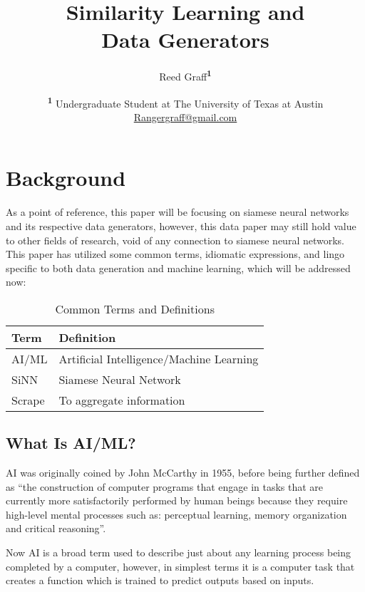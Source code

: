 \documentclass[
	letterpaper, %
	10pt, %
	unnumberedsections, %
	twoside, %
]{LTJournalArticle}
\title{Similarity Learning and\\ Data Generators} %
\author{%
	Reed Graff\textsuperscript{\textbf{1}}
}
\date{\footnotesize\textsuperscript{\textbf{1}} Undergraduate Student at The University of Texas at Austin \\ \href{mailto:Rangergraff@gmail.com}{Rangergraff@gmail.com}}
\begin{document}
\maketitle %


\section{Background}

As a point of reference, this paper will be focusing on siamese neural networks and its respective data generators, however, this data paper may still hold value to other fields of research, void of any connection to siamese neural networks. This paper has utilized some common terms, idiomatic expressions, and lingo specific to both data generation and machine learning, which will be addressed now:

\begin{table}[hbt!] %
	\caption{Common Terms and Definitions}
	\centering
	\begin{tabular}{l l}
		\toprule
		Term & Definition \\
		\midrule
        AI/ML & Artificial Intelligence/Machine Learning \\
        SiNN & Siamese Neural Network \\
        Scrape & To aggregate information \\
		\bottomrule
	\end{tabular}
	\label{tab:terms}
\end{table}

\subsection{What Is AI/ML?}
AI was originally coined by John McCarthy in 1955, before being further defined as “the construction of computer programs that engage in tasks that are currently more satisfactorily performed by human beings because they require high-level mental processes such as: perceptual learning, memory organization and critical reasoning”\autocite{forbes_press, history_of_artificial_intelligence}.

Now AI is a broad term used to describe just about any learning process being completed by a  computer, however, in simplest terms it is a computer task that creates a function which is trained to predict outputs based on inputs.
\end{document}

